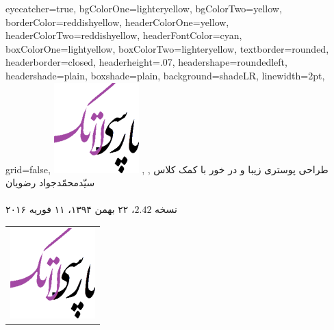 \documentclass[debug,a0paper]{xebaposter}
\begin{document}

      \begin{poster}%
      {
      eyecatcher=true,
      bgColorOne=lighteryellow,%
      bgColorTwo=yellow,
      borderColor=reddishyellow,
      headerColorOne=yellow,
      headerColorTwo=reddishyellow,
      headerFontColor=cyan,
      boxColorOne=lightyellow,      
      boxColorTwo=lighteryellow,
      textborder=rounded,
      headerborder=closed,
      headerheight=.07\textheight,
      headershape=roundedleft,
      headershade=plain,
      boxshade=plain,
      background=shadeLR,
      linewidth=2pt,
      grid=false, %
      }
 {
      \includegraphics[height=0.05\textheight]{logo}
 }
 {طراحی پوستری زیبا و در خور با کمک کلاس 
}
 {\large {}, , سیّدمحمّدجواد رضویان
 \\%
 {\normalsize\texttt{}
 \\
نسخه $2.42$، ۲۲ بهمن ۱۳۹۴، ۱۱ فوریه ۲۰۱۶
 }}
 {
\begin{tabular}{r}
    \includegraphics[height=0.05 \textheight]{logo}\\
\end{tabular}
 }


\end{poster}
\end{document}
